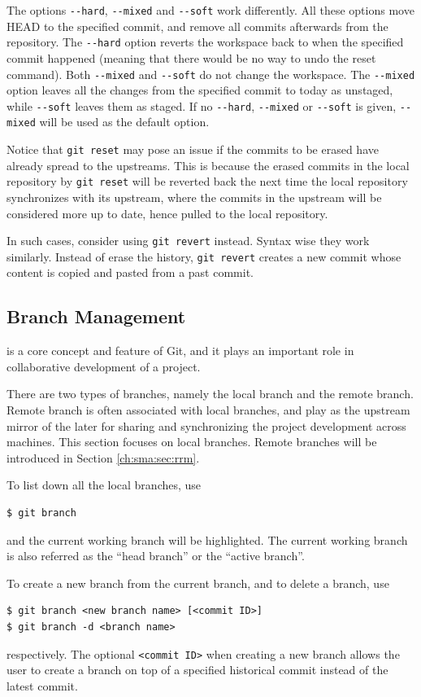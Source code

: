 The options \verb|--hard|, \verb|--mixed| and \verb|--soft| work differently. All these options move HEAD to the specified commit, and remove all commits afterwards from the repository. The \verb|--hard| option reverts the workspace back to when the specified commit happened (meaning that there would be no way to undo the reset command). Both \verb|--mixed| and \verb|--soft| do not change the workspace. The \verb|--mixed| option leaves all the changes from the specified commit to today as unstaged, while \verb|--soft| leaves them as staged. If no \verb|--hard|, \verb|--mixed| or \verb|--soft| is given, \verb|--mixed| will be used as the default option.

Notice that \verb|git reset| may pose an issue if the commits to be erased have already spread to the upstreams. This is because the erased commits in the local repository by \verb|git reset| will be reverted back the next time the local repository synchronizes with its upstream, where the commits in the upstream will be considered more up to date, hence pulled to the local repository.

In such cases, consider using \verb|git revert| instead. Syntax wise they work similarly. Instead of erase the history, \verb|git revert| creates a new commit whose content is copied and pasted from a past commit.

\subsection{Branch Management}

 is a core concept and feature of Git, and it plays an important role in collaborative development of a project. 

There are two types of branches, namely the local branch and the remote branch. Remote branch is often associated with local branches, and play as the upstream mirror of the later for sharing and synchronizing the project development across machines. This section focuses on local branches. Remote branches will be introduced in Section \ref{ch:sma:sec:rrm}.

To list down all the local branches, use
\begin{lstlisting}
$ git branch
\end{lstlisting}
and the current working branch will be highlighted. The current working branch is also referred as the ``head branch'' or the ``active branch''.

To create a new branch from the current branch, and to delete a branch, use
\begin{lstlisting}
$ git branch <new branch name> [<commit ID>]
$ git branch -d <branch name>
\end{lstlisting}
respectively. The optional \verb|<commit ID>| when creating a new branch allows the user to create a branch on top of a specified historical commit instead of the latest commit.


